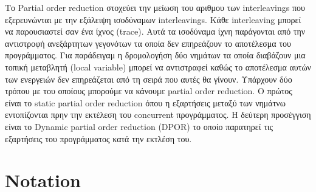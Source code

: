 Το Partial order reduction στοχεύει την μείωση του αριθμου των interleavings που εξερευνώνται με την εξάλειψη ισοδύναμων interleavings.
Κάθε interleaving μπορεί να παρουσιαστεί σαν ένα ίχνος (trace).
Αυτά τα ισοδύναμα ίχνη παράγονται από την αντιστροφή ανεξάρτητων γεγονότων τα οποία δεν επηρεάζουν το αποτέλεσμα του προγράμματος. Για παράδειγαμ η δρομολογήση δύο νημάτων τα οποία
διαβάζουν μια τοπική μεταβλητή (local variable) μπορεί να αντιστραφεί καθώς το αποτέλεσμα αυτών των ενεργειών δεν επηρεάζεται από τη σειρά που αυτές θα γίνουν.
Υπάρχουν δύο τρόπου με του οποίους μπορούμε να κάνουμε partial order reduction. Ο πρώτος είναι το 
static partial order reduction \cite{Static1997} όπου η εξαρτήσεις μεταξύ των νημάτνω εντοπίζονται πρην την εκτέλεση του concurrent προγράμματος. 
Η δεύτερη προσέγγιση είναι το  Dynamic partial order reduction (DPOR) \cite{FlanaganDPOR} το οποίο παρατηρεί τις εξαρτήσεις του προγράμματος κατά την εκτλέση του.

\section{Notation}

